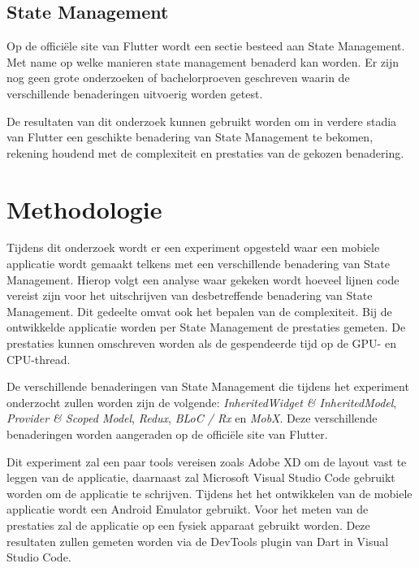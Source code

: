 
\subsection*{State Management}
Op de officiële site van Flutter wordt een sectie besteed aan State Management.
Met name op welke manieren state management benaderd kan worden. Er zijn nog geen grote
onderzoeken of bachelorproeven geschreven waarin de verschillende benaderingen uitvoerig worden getest.

De resultaten van dit onderzoek kunnen gebruikt worden om in verdere stadia van Flutter
een geschikte benadering van State Management te bekomen, rekening houdend met de complexiteit en prestaties
van de gekozen benadering.


\section{Methodologie}
\label{sec:methodologie}
Tijdens dit onderzoek wordt er een experiment opgesteld waar een mobiele applicatie wordt gemaakt 
telkens met een verschillende benadering van State Management. 
Hierop volgt een analyse waar gekeken wordt hoeveel lijnen code vereist zijn voor het uitschrijven van
desbetreffende benadering van State Management. Dit gedeelte omvat ook het bepalen van de complexiteit.
Bij de ontwikkelde applicatie worden per State Management de prestaties gemeten.
De prestaties kunnen omschreven worden als de gespendeerde tijd op de GPU- en CPU-thread.

De verschillende benaderingen van State Management die tijdens het experiment onderzocht zullen worden zijn de volgende: \emph{InheritedWidget \& InheritedModel}, 
\emph{Provider \& Scoped Model}, \emph{Redux}, \emph{BLoC / Rx} en \emph{MobX}.
Deze verschillende benaderingen worden aangeraden op de officiële site van Flutter.

Dit experiment zal een paar tools vereisen zoals Adobe XD om de layout vast te leggen van de applicatie,
daarnaast zal Microsoft Visual Studio Code gebruikt worden om de applicatie te schrijven.
Tijdens het het ontwikkelen van de mobiele applicatie wordt een Android Emulator gebruikt. Voor het meten van de prestaties zal de applicatie op een fysiek apparaat gebruikt worden. Deze resultaten zullen gemeten worden via de DevTools plugin van Dart in Visual Studio Code.

